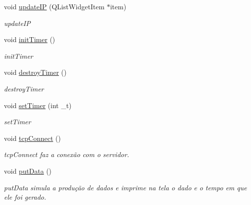 \begin{DoxyCompactItemize}
void \mbox{\hyperlink{class_main_window_a288baaab0a21fb3b372f2da4307c1ff6}{update\+IP}} (Q\+List\+Widget\+Item $\ast$item)
\begin{DoxyCompactList}\small\item\em update\+IP \end{DoxyCompactList}\item 
\mbox{\label{class_main_window_a7fd62e78b41bf758052da7d1451699cb}} 
void \mbox{\hyperlink{class_main_window_a7fd62e78b41bf758052da7d1451699cb}{init\+Timer}} ()
\begin{DoxyCompactList}\small\item\em init\+Timer \end{DoxyCompactList}\item 
\mbox{\label{class_main_window_a3ad9aa1924e5560afa1ee473da5c272e}} 
void \mbox{\hyperlink{class_main_window_a3ad9aa1924e5560afa1ee473da5c272e}{destroy\+Timer}} ()
\begin{DoxyCompactList}\small\item\em destroy\+Timer \end{DoxyCompactList}\item 
void \mbox{\hyperlink{class_main_window_ab5db2dcd9b9592285a18fa7d19256e6a}{set\+Timer}} (int \+\_\+t)
\begin{DoxyCompactList}\small\item\em set\+Timer \end{DoxyCompactList}\item 
\mbox{\label{class_main_window_ac5b669957c442b6eb68573dacfce33e1}} 
void \mbox{\hyperlink{class_main_window_ac5b669957c442b6eb68573dacfce33e1}{tcp\+Connect}} ()
\begin{DoxyCompactList}\small\item\em tcp\+Connect faz a conexão com o servidor. \end{DoxyCompactList}\item 
\mbox{\label{class_main_window_afdfeb13ec363b0eb8ecacaf0aa13b605}} 
void \mbox{\hyperlink{class_main_window_afdfeb13ec363b0eb8ecacaf0aa13b605}{put\+Data}} ()
\begin{DoxyCompactList}\small\item\em put\+Data simula a produção de dados e imprime na tela o dado e o tempo em que ele foi gerado. \end{DoxyCompactList}\item 

\end{DoxyCompactItemize}
